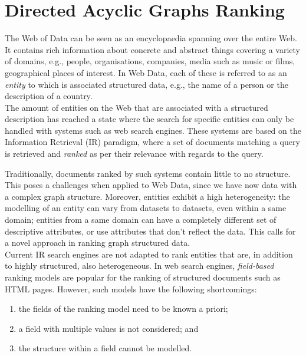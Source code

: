\chapter{Directed Acyclic Graphs Ranking}
\label{chap:tree-ranking}

The Web of Data can be seen as an encyclopaedia spanning over the entire Web. It contains rich information about concrete and abstract things covering a variety of domains, e.g., people, organisations, companies, media such as music or films, geographical places of interest. In Web Data, each of these is referred to as an \emph{entity} to which is associated structured data, e.g., the name of a person or the description of a country.\\

The amount of entities on the Web that are associated with a structured description has reached a state where the search for specific entities can only be handled with systems such as web search engines. These systems are based on the Information Retrieval (IR) paradigm, where a set of documents matching a query is retrieved and \emph{ranked} as per their relevance with regards to the query.

Traditionally, documents ranked by such systems contain little to no structure. This poses a challenges when applied to Web Data, since we have now data with a complex graph structure. Moreover, entities exhibit a high heterogeneity: the modelling of an entity can vary from datasets to datasets, even within a same domain; entities from a same domain can have a completely different set of descriptive attributes, or use attributes that don't reflect the data. This calls for a novel approach in ranking graph structured data.\\

Current IR search engines are not adapted to rank entities that are, in addition to highly structured, also heterogeneous. In web search engines, \emph{field-based} ranking models are popular for the ranking of structured documents such as HTML pages. However, such models have the following shortcomings:
\begin{enumerate}
	\item the fields of the ranking model need to be known a priori;
	\item a field with multiple values is not considered; and
	\item the structure within a field cannot be modelled.
\end{enumerate}

